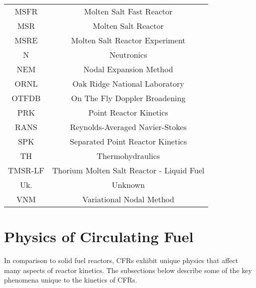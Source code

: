 \documentclass[review]{elsarticle}
\begin{document}
\begin{table}[h]
\begin{center}
\begin{tabular}{|c c|}
            MSFR & Molten Salt Fast Reactor \\
            MSR & Molten Salt Reactor \\
            MSRE & Molten Salt Reactor Experiment \\
            N & Neutronics \\
            NEM & Nodal Expansion Method \\
            ORNL & Oak Ridge National Laboratory \\
            OTFDB & On The Fly Doppler Broadening \\
            PRK & Point Reactor Kinetics \\
            RANS & Reynolds-Averaged Navier-Stokes \\
            SPK & Separated Point Reactor Kinetics \\
            TH & Thermohydraulics \\
            TMSR-LF & Thorium Molten Salt Reactor - Liquid Fuel \\
            Uk. & Unknown \\
            VNM & Variational Nodal Method \\
            \hline
        \end{tabular}
    \end{center}
\end{table}

\section{Physics of Circulating Fuel} \label{sec:physics}
In comparison to solid fuel reactors, CFRs exhibit unique
physics that affect many aspects of reactor kinetics. The subsections below 
describe some of the key phenomena unique to the kinetics of CFRs.
\end{document}

